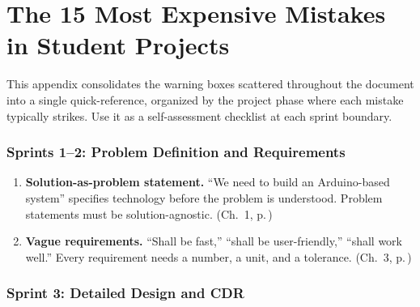 \chapter*{The 15 Most Expensive Mistakes in Student Projects}

This appendix consolidates the warning boxes scattered throughout the document into a single quick-reference, organized by the project phase where each mistake typically strikes. Use it as a self-assessment checklist at each sprint boundary.

\subsection*{Sprints 1--2: Problem Definition and Requirements}

\begin{enumerate}[leftmargin=1.5em]

\item \textbf{Solution-as-problem statement.} ``We need to build an Arduino-based system'' specifies technology before the problem is understood. Problem statements must be solution-agnostic. (Ch.~1, p.\,\pageref{ch:problem})

\item \textbf{Vague requirements.} ``Shall be fast,'' ``shall be user-friendly,'' ``shall work well.'' Every requirement needs a number, a unit, and a tolerance. (Ch.~3, p.\,\pageref{ch:requirements})

\end{enumerate}

\subsection*{Sprint 3: Detailed Design and CDR}

